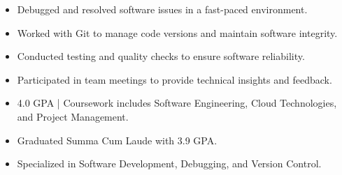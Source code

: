 \par\smallskip
\noindent
\begin{minipage}{20cm}
  \begin{minipage}{9.75cm}
    \begin{itemize}
      \item Debugged and resolved software issues in a fast-paced environment.
      \item Worked with Git to manage code versions and maintain software integrity.
    \end{itemize}
  \end{minipage}
  \hfill
  \begin{minipage}{9.75cm}
    \begin{itemize}
      \item Conducted testing and quality checks to ensure software reliability.
      \item Participated in team meetings to provide technical insights and feedback.
    \end{itemize}
  \end{minipage}
\end{minipage}
\par\smallskip
\divider

\begin{itemize}
  \item 4.0 GPA | Coursework includes Software Engineering, Cloud Technologies, and Project Management.
\end{itemize}
\divider

\begin{itemize}
  \item Graduated Summa Cum Laude with 3.9 GPA.
  \item Specialized in Software Development, Debugging, and Version Control.
\end{itemize}

\noindent
\begin{minipage}{20cm}
\end{minipage}


